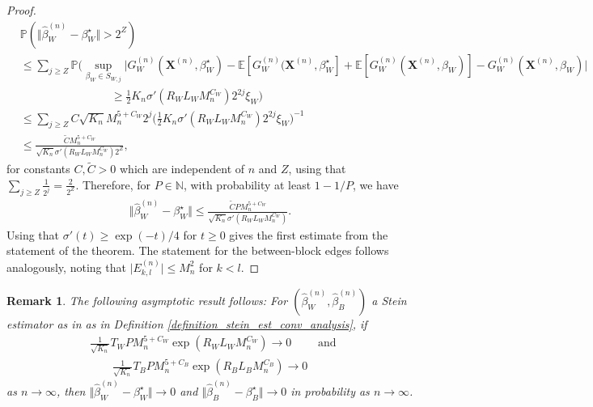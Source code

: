 \documentclass{article}
\newtheorem{Remark}[Theorem]{Remark}
\begin{document}
\begin{proof}
    \begin{align*}
        &\mathbb{P}(\Vert \hat{\beta}_W^{(n)} - \beta_W^{\star} \Vert > 2^Z  ) \\
        & \leq \sum_{j\geq Z} \mathbb{P}\bigg( \sup_{\beta_W \in S_{W,j}} \big\vert G_W^{(n)}(\mathbf{X}^{(n)},\beta_W^{\star}) - \mathbb{E}[ G_W^{(n)}(\mathbf{X}^{(n)},\beta_W^{\star}] + \mathbb{E}[G_W^{(n)}(\mathbf{X}^{(n)},\beta_W)] -G_W^{(n)}(\mathbf{X}^{(n)},\beta_W)\big\vert \\
        & \qquad \qquad \qquad \qquad \geq \frac{1}{2} K_n \sigma'(R_W L_W M_n^{C_W} ) 2^{2j} \xi_W  \bigg) \\
        & \leq \sum_{j\geq Z}  C \sqrt{K_n}  M_n^{5+C_W} 2 ^j \bigg( \frac{1}{2} K_n \sigma'(R_W L_W M_n^{C_W} ) 2^{2j} \xi_W \bigg)^{-1} \\
        & \leq \frac{\widetilde{C} M_n^{5+C_W} }{\sqrt{K_n}\sigma'(R_W L_W M_n^{C_W} )2^Z },
    \end{align*}
    for constants $C, \widetilde{C} >0$ which are independent of $n$ and $Z$, using that   $\sum_{j\geq Z} \frac{1}{2^j} = \frac{2}{2^Z}$. Therefore, for $P \in \mathbb{N}$, with probability at least $1-1/P$, we have
    \begin{align*}
        \Vert \hat{\beta}_W^{(n)} - \beta_W^{\star} \Vert \leq \frac{\widetilde{C} P M_n^{5+C_W} }{\sqrt{K_n}\sigma'(R_W L_W M_n^{C_W} ) }.
    \end{align*}
    Using that $\sigma'(t) \geq \exp(-t)/4$ for $t \geq 0$ gives the first estimate from the statement of the theorem. The statement for the between-block edges follows  analogously, noting that $\vert E_{k,l}^{(n)}\vert \leq M_n^2$ for $k<l$.
\end{proof}


\begin{Remark} \label{remark_standard_error_asym}
The following asymptotic result follows:  For   $( \hat{\beta}_W^{(n)},  \hat{\beta}_B^{(n)})$  a Stein estimator as in as in Definition \ref{definition_stein_est_conv_analysis},
if
\begin{align*}
    & \frac{1}{\sqrt{K_n}} T_W P M_n^{5+C_W} \exp(R_W L_W M_n^{C_W} ) \rightarrow 0 \qquad \text{ and }\\
    & \qquad \frac{1}{\sqrt{K_n}} T_B P M_n^{5+C_B} \exp(R_B L_B M_n^{C_B} ) \rightarrow 0
\end{align*}
as $n \rightarrow \infty$, then  $\Vert \hat{\beta}_W^{(n)} - \beta_W^{\star} \Vert \rightarrow 0 $ and $\Vert \hat{\beta}_B^{(n)} - \beta_B^{\star} \Vert \rightarrow 0 $ in probability as $ n \rightarrow \infty$.
\end{Remark}
\end{document}
